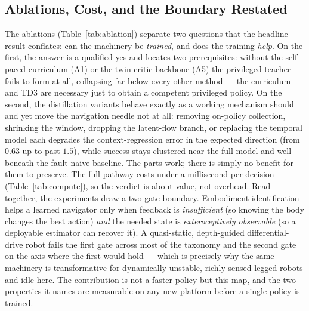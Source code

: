 \documentclass[journal]{IEEEtran}
\begin{document}
\subsection{Ablations, Cost, and the Boundary Restated}


The ablations (Table~\ref{tab:ablation}) separate two questions that the
headline result conflates: can the machinery be \emph{trained}, and does the
training \emph{help}. On the first, the answer is a qualified yes and locates
two prerequisites: without the self-paced curriculum (A1) or the twin-critic
backbone (A5) the privileged teacher fails to form at all, collapsing far below
every other method --- the curriculum and TD3 are necessary just to obtain a
competent privileged policy. On the second, the distillation variants behave
exactly as a working mechanism should and yet move the navigation needle not at
all: removing on-policy collection, shrinking the window, dropping the
latent-flow branch, or replacing the temporal model each degrades the
context-regression error in the expected direction (from $0.63$ up to past
$1.5$), while success stays clustered near the full model and well beneath the
fault-naive baseline. The parts work; there is simply no benefit for them to
preserve. The full pathway
costs under a millisecond per decision (Table~\ref{tab:compute}), so the
verdict is about value, not overhead. Read together, the experiments draw a
two-gate boundary. Embodiment identification helps a learned navigator only
when feedback is \emph{insufficient} (so knowing the body changes the best
action) \emph{and} the needed state is \emph{exteroceptively observable} (so a
deployable estimator can recover it). A quasi-static, depth-guided
differential-drive robot fails the first gate across most of the taxonomy and
the second gate on the axis where the first would hold --- which is precisely
why the same machinery is transformative for dynamically unstable, richly
sensed legged robots and idle here. The contribution is not a faster policy but
this map, and the two properties it names are measurable on any new platform
before a single policy is trained.
\end{document}
